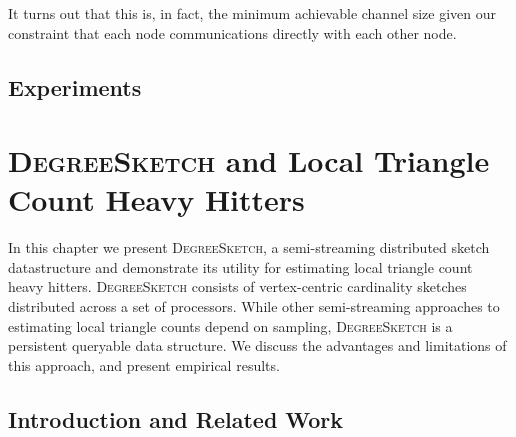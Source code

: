 \documentclass{report}
\newcommand{\algoname}[1]{\textnormal{\textsc{#1}}}
\begin{document}
It turns out that this is, in fact, the minimum achievable channel size  given our constraint that each node communications directly with each other node.


\section{Experiments} \label{async:sec:experiments}











\chapter{\algoname{DegreeSketch} and Local Triangle Count Heavy Hitters}
 \label{chap:DS}


In this chapter we present \algoname{DegreeSketch}, a semi-streaming distributed sketch datastructure and demonstrate its utility for estimating local triangle count heavy hitters.
\algoname{DegreeSketch} consists of vertex-centric cardinality sketches distributed across a set of processors. 
While other semi-streaming approaches to estimating local triangle counts depend on sampling, \algoname{DegreeSketch} is a persistent queryable data structure.
We discuss the advantages and limitations of this approach, and present empirical results.

\section{Introduction and Related Work}
 \label{DS:sec:DS}
\end{document}
